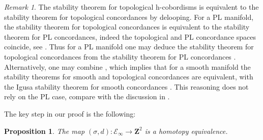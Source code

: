 \documentclass[reqno]{amsart}
\theoremstyle{theorem}
\newtheorem{proposition}[corollary]{Proposition}
\theoremstyle{remark}
\newtheorem{remark}[corollary]{Remark}
\theoremstyle{definition}
\newcommand{\E}{\mathcal{E}}
\newcommand{\Z}{\mathbf{Z}}
\begin{document}
\begin{remark}
The stability theorem for topological h-cobordisms is equivalent to the stability theorem for topological concordances by delooping. For a PL manifold, the stability theorem for topological concordances is equivalent to the stability theorem for PL concordances, indeed the topological and PL concordance spaces coincide, see \cite[Theorem 6.2, p41]{BL74}. Thus for a PL manifold one may deduce the stability theorem for topological concordances from the stability theorem for PL concordances \cite{H75}. Alternatively, one may combine \cite[Theorem C, p451]{BL77}, which implies that for a smooth manifold the stability theorems for smooth and topological concordances are equivalent, with the Igusa stability theorem for smooth concordances \cite{I}. This reasoning does not rely on the PL case, compare with the discussion in \cite[Theorem 1.4.1, p22]{JRW}.
  \end{remark}
  
  The key step in our proof is the following:
\begin{proposition} \label{prop:twisted-derivative:3}
The map $(\sigma,d):\E_\infty \to \Z^2$ is a homotopy equivalence.
\end{proposition}
\end{document}
